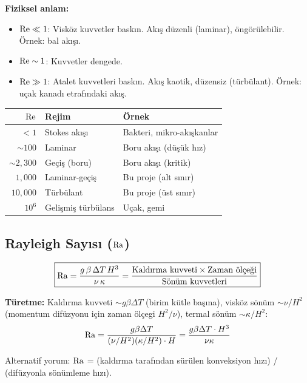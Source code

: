 \textbf{Fiziksel anlam:}
\begin{itemize}
    \item $\mathrm{Re} \ll 1$: Visköz kuvvetler baskın. Akış düzenli (laminar), öngörülebilir. Örnek: bal akışı.
    \item $\mathrm{Re} \sim 1$: Kuvvetler dengede.
    \item $\mathrm{Re} \gg 1$: Atalet kuvvetleri baskın. Akış kaotik, düzensiz (türbülant). Örnek: uçak kanadı etrafındaki akış.
\end{itemize}

\begin{center}
\begin{tabular}{rll}
\toprule
$\mathrm{Re}$ & \textbf{Rejim} & \textbf{Örnek} \\
\midrule
$< 1$ & Stokes akışı & Bakteri, mikro-akışkanlar \\
$\sim 100$ & Laminar & Boru akışı (düşük hız) \\
$\sim 2{,}300$ & Geçiş (boru) & Boru akışı (kritik) \\
$1{,}000$ & Laminar-geçiş & Bu proje (alt sınır) \\
$10{,}000$ & Türbülant & Bu proje (üst sınır) \\
$10^6$ & Gelişmiş türbülans & Uçak, gemi \\
\bottomrule
\end{tabular}
\end{center}


\subsection{Rayleigh Sayısı ($\mathrm{Ra}$)}
\label{subsec:rayleigh}

\begin{equation}
    \boxed{\mathrm{Ra} = \frac{g\,\beta\,\Delta T\,H^3}{\nu\,\kappa} = \frac{\text{Kaldırma kuvveti} \times \text{Zaman ölçeği}}{\text{Sönüm kuvvetleri}}}
    \label{eq:rayleigh}
\end{equation}

\textbf{Türetme:} Kaldırma kuvveti $\sim g\beta\Delta T$ (birim kütle başına), visköz sönüm $\sim \nu/H^2$ (momentum difüzyonu için zaman ölçegi $H^2/\nu$), termal sönüm $\sim \kappa/H^2$:
\begin{equation}
    \mathrm{Ra} = \frac{g\beta\Delta T}{(\nu/H^2)(\kappa/H^2) \cdot H} = \frac{g\beta\Delta T \cdot H^3}{\nu\kappa}
\end{equation}

Alternatif yorum: $\mathrm{Ra}$ = (kaldırma tarafından sürülen konveksiyon hızı) / (difüzyonla sönümleme hızı).


